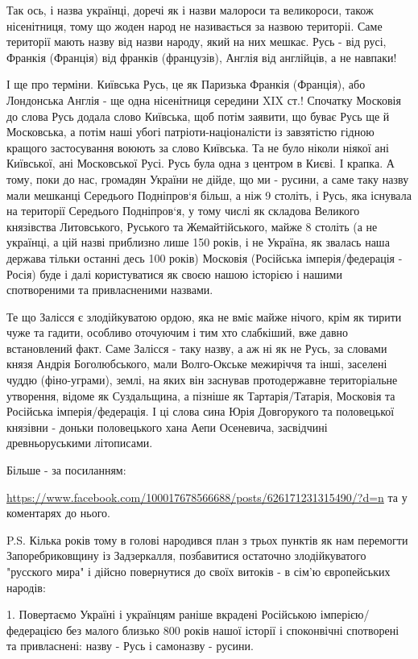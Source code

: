 Так ось, і назва українці, доречі як і назви малороси та великороси, також
нісенітниця, тому що жоден народ не називається за назвою територіі. Саме
території мають назву від назви народу, який на них мешкає. Русь - від русі,
Франкія (Франція) від франків (французів), Англія від англійців, а не навпаки!

І ще про терміни. Київська Русь, це як Паризька Франкія (Франція), або
Лондонська Англія - ще одна нісенітниця середини XIX ст.! Спочатку Московія до
слова Русь додала слово Київська, щоб потім заявити, що буває Русь ще й
Московська, а потім наші убогі патріоти-націоналісти із завзятістю гідною
кращого застосування воюють за слово Київська. Та не було ніколи ніякої ані
Київської, ані Московської Русі. Русь була одна з центром в Києві. І крапка. А
тому, поки до нас, громадян України не дійде, що ми - русини, а саме таку назву
мали мешканці Середього Подніпров‘я більш, а ніж 9 століть, і Русь, яка
існувала на території Середього Подніпров‘я, у тому числі як складова Великого
князівства Литовського, Руського та Жемайтійського, майже 8 століть (а не
українці, а цій назві приблизно лише 150 років, і не Україна, як звалась наша
держава тільки останні десь 100 років) Московія (Російська імперія/федерація -
Росія) буде і далі користуватися як своєю нашою історією і нашими спотвореними
та привласненими назвами.

Те що Залісся є злодійкуватою ордою, яка не вміє майже нічого, крім як тирити
чуже та гадити, особливо оточуючим і тим хто слабкіший, вже давно встановлений
факт. Саме Залісся - таку назву, а аж ні як не Русь, за словами князя Андрія
Боголюбського, мали Волго-Окське межиріччя та інші, заселені чуддю
(фіно-уграми), землі, на яких він заснував протодержавне територіальне
утворення, відоме як Суздальщина, а пізніше як Тартарія/Татарія, Московія та
Російська імперія/федерація. І ці слова сина Юрія Довгорукого та половецької
князівни - доньки половецького хана Аепи Осеневича, засвідчині древньоруськими
літописами.

Більше - за посиланням: 

\url{https://www.facebook.com/100017678566688/posts/626171231315490/?d=n} та у коментарях до нього.

P.S. Кілька років тому в голові народився план з трьох пунктів як нам перемогти
Запоребриковщину із Задзеркалля, позбавитися остаточно злодійкуватого "русского
мира" і дійсно повернутися до своїх витоків - в сім'ю європейських народів:

1. Повертаємо Україні і українцям раніше вкрадені Російською
імперією/федерацією без малого близько 800 років нашої історії і споконвічні
спотворені та привласнені: назву - Русь і самоназву - русини.

